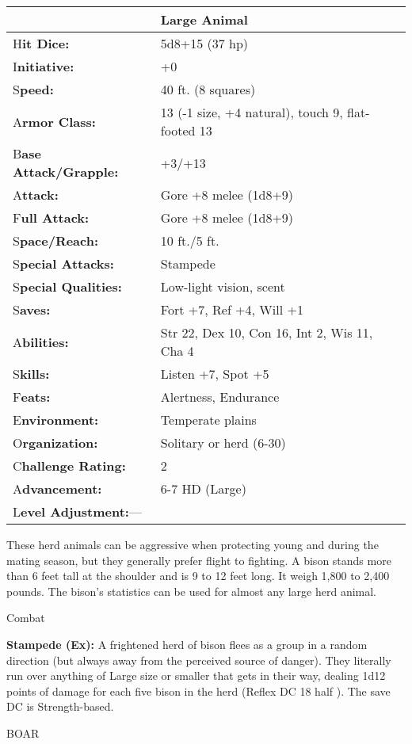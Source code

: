 \documentclass{article}
\begin{document}
\begin{tabular}{|>{\raggedright}p{91pt}|>{\raggedright}p{186pt}|}
\hline
  & Large Animal\tabularnewline
\hline
H\textbf{it Dice:} & 5d8+15 (37 hp)\tabularnewline
\hline
I\textbf{nitiative:} & +0\tabularnewline
\hline
S\textbf{peed:} & 40 ft. (8 squares)\tabularnewline
\hline
A\textbf{rmor Class:} & 13 (-1 size, +4 natural), touch 9, flat-footed 13\tabularnewline
\hline
B\textbf{ase Attack/Grapple:} & +3/+13\tabularnewline
\hline
A\textbf{ttack:} & Gore +8 melee (1d8+9)\tabularnewline
\hline
F\textbf{ull Attack:} & Gore +8 melee (1d8+9)\tabularnewline
\hline
S\textbf{pace/Reach:} & 10 ft./5 ft.\tabularnewline
\hline
S\textbf{pecial Attacks:} & Stampede\tabularnewline
\hline
S\textbf{pecial Qualities:} & Low-light vision, scent\tabularnewline
\hline
S\textbf{aves:} & Fort +7, Ref +4, Will +1\tabularnewline
\hline
A\textbf{bilities:} & Str 22, Dex 10, Con 16, Int 2, Wis 11, Cha 4\tabularnewline
\hline
S\textbf{kills:} & Listen +7, Spot +5\tabularnewline
\hline
F\textbf{eats:} & Alertness, Endurance\tabularnewline
\hline
E\textbf{nvironment:} & Temperate plains\tabularnewline
\hline
O\textbf{rganization:} & Solitary or herd (6-30)\tabularnewline
\hline
C\textbf{hallenge Rating:} & 2\tabularnewline
\hline
A\textbf{dvancement:} & 6-7 HD (Large)\tabularnewline
\hline
L\textbf{evel Adjustment:}--- & \tabularnewline
\hline
\end{tabular}

These herd animals can be aggressive when protecting young and during the mating 
season, but they generally prefer flight to fighting. A bison stands more than 
6 feet tall at the shoulder and is 9 to 12 feet long. It weigh 1,800 to 2,400 pounds. 
The bison's statistics can be used for almost any large herd animal.

Combat

\textbf{Stampede (Ex):} A frightened herd of bison flees as a group in a random 
direction (but always away from the perceived source of danger). They literally 
run over anything of Large size or smaller that gets in their way, dealing 1d12 
points of damage for each five bison in the herd (Reflex DC 18 half ). The save 
DC is Strength-based.

\vspace{12pt}
BOAR
\end{document}

